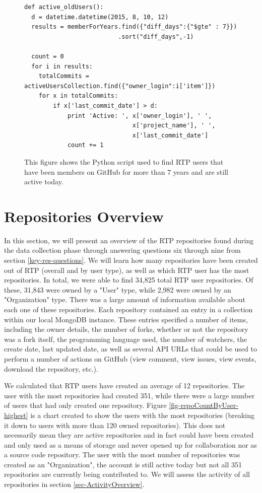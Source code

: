 \begin{figure}
\footnotesize
\begin{lstlisting}
def active_oldUsers():
  d = datetime.datetime(2015, 8, 10, 12)
  results = memberForYears.find({"diff_days":{"$gte" : 7}})
                          .sort("diff_days",-1)

  count = 0
  for i in results:
    totalCommits = activeUsersCollection.find({"owner_login":i['item']})
    for x in totalCommits:
        if x['last_commit_date'] > d:
            print 'Active: ', x['owner_login'], ' ', 
                              x['project_name'], ' ',
                              x['last_commit_date']
            count += 1
\end{lstlisting}
\caption{This figure shows the Python script used to find RTP users that have been members on GitHub for more than 7 years and are still active today.}
\label{fig-activeUsers}
\end{figure}

\section{Repositories Overview}
\label{sec:RepositoriesOverview}
In this section, we will present an overview of the RTP repositories found during the data collection phase through answering questions six through nine from section \ref{key-res-questions}. We will learn how many repositories have been created out of RTP (overall and by user type), as well as which RTP user has the most repositories. In total, we were able to find 34,825 total RTP user repositories. Of these, 31,843 were owned by a "User" type, while 2,982 were owned by an "Organization" type. There was a large amount of information available about each one of these repositories. Each repository contained an entry in a collection within our local MongoDB instance. These entries specified a number of items, including the owner details, the number of forks, whether or not the repository was a fork itself, the programming language used, the number of watchers, the create date, last updated date, as well as several API URLs that could be used to perform a number of actions on GitHub (view comment, view issues, view events, download the repository, etc.).

We calculated that RTP users have created an average of 12 repositories. The user with the most repositories had created 351, while there were a large number of users that had only created one repository. Figure \ref{fig-repoCountByUser-highest} is a chart created to show the users with the most repositories (breaking it down to users with more than 120 owned repositories). This does not necessarily mean they are active repositories and in fact could have been created and only used as a means of storage and never opened up for collaboration nor as a source code repository. The user with the most number of repositories was created as an "Organization", the account is still active today but not all 351 repositories are currently being contributed to. We will assess the activity of all repositories in section \ref{sec-ActivityOverview}. 

